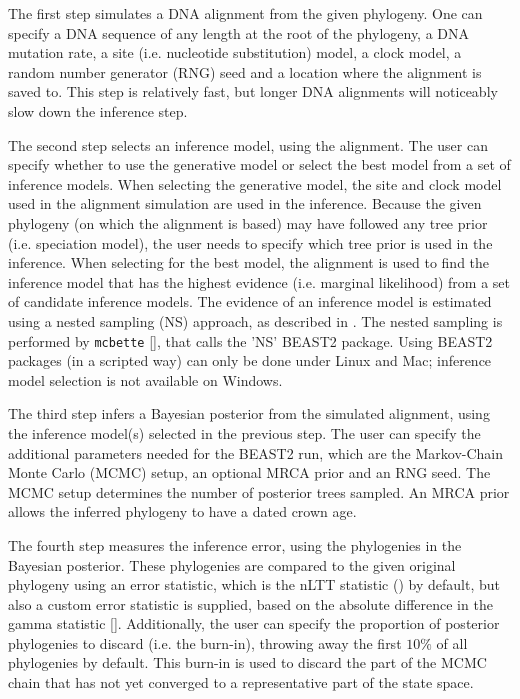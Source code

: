 \documentclass{article}
\begin{document}
The first step simulates a DNA alignment from the given phylogeny.
One can specify a DNA sequence
of any length at the root of the phylogeny, a DNA mutation rate, a
site (i.e. nucleotide substitution) model, 
a clock model, a random number generator (RNG) seed and a location
where the alignment is saved to. This step is relatively fast, but longer
DNA alignments will noticeably slow down the inference step.

The second step selects an inference model, using the alignment.
The user can specify whether to use the generative model or select the best model
from a set of inference models. 
When selecting the generative model,
the site and clock model used in the alignment simulation are used
in the inference. Because the given phylogeny (on which the alignment is based)
may have followed any tree prior (i.e. speciation model), the user needs
to specify which tree prior is used in the inference. 
When selecting for the best
model, the alignment is used to find the inference model that has the
highest evidence (i.e. marginal likelihood) from a set of candidate inference models.
The evidence of an inference model is estimated using a nested sampling (NS)
approach, as described in \cite{maturana2018model}. The nested sampling is
performed by \verb;mcbette; [\cite{mcbette}], that calls the 'NS' BEAST2 package. 
Using BEAST2 packages (in a scripted way) can only be done under Linux and Mac; 
inference model selection is not available on Windows.

The third step infers a Bayesian posterior from the simulated alignment,
using the inference model(s) selected in the previous step. The user
can specify the additional parameters needed for the BEAST2 run, which
are the Markov-Chain Monte Carlo (MCMC) setup, 
an optional MRCA prior and an RNG seed.
The MCMC setup determines the number of posterior trees sampled.
An MRCA prior allows the inferred phylogeny to have a dated crown age.

The fourth step measures the inference error, using the phylogenies in the
Bayesian posterior. These phylogenies are compared to the given
original phylogeny using an error statistic, which is the nLTT 
statistic (\cite{janzen2015approximate}) by default,
but also a custom error statistic is supplied, based
on the absolute difference in the gamma statistic [\cite{pybus2000testing}]. 
Additionally, the user can specify the
proportion of posterior phylogenies to 
discard (i.e. the burn-in), throwing away the first $10\%$
of all phylogenies by default. This burn-in is used to discard
the part of the MCMC chain that has not yet converged to a
representative part of the state space.
\end{document}
